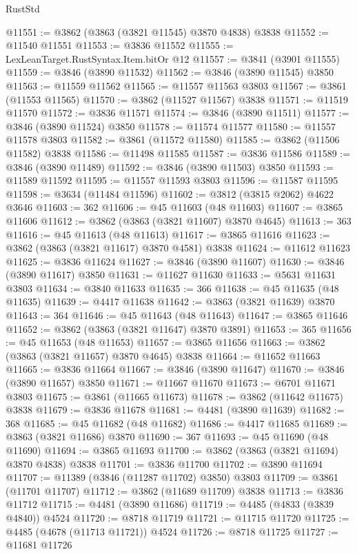 \begin{lexlean}{RustStd}
\begin{coremodule}
@11551 := @3862 (@3863 (@3821 @11545) @3870 @4838) @3838
@11552 := @11540 @11551
@11553 := @3836 @11552
@11555 := LexLeanTarget.RustSyntax.Item.bitOr @12
@11557 := @3841 (@3901 @11555)
@11559 := @3846 (@3890 @11532)
@11562 := @3846 (@3890 @11545) @3850
@11563 := @11559 @11562
@11565 := @11557 @11563 @3803
@11567 := @3861 (@11553 @11565)
@11570 := @3862 (@11527 @11567) @3838
@11571 := @11519 @11570
@11572 := @3836 @11571
@11574 := @3846 (@3890 @11511)
@11577 := @3846 (@3890 @11524) @3850
@11578 := @11574 @11577
@11580 := @11557 @11578 @3803
@11582 := @3861 (@11572 @11580)
@11585 := @3862 (@11506 @11582) @3838
@11586 := @11498 @11585
@11587 := @3836 @11586
@11589 := @3846 (@3890 @11489)
@11592 := @3846 (@3890 @11503) @3850
@11593 := @11589 @11592
@11595 := @11557 @11593 @3803
@11596 := @11587 @11595
@11598 := @3634 (@11484 @11596)
@11602 := @3812 (@3815 @2062) @4622 @3646
@11603 := 362
@11606 := @45 @11603 (@48 @11603)
@11607 := @3865 @11606
@11612 := @3862 (@3863 (@3821 @11607) @3870 @4645)
@11613 := 363
@11616 := @45 @11613 (@48 @11613)
@11617 := @3865 @11616
@11623 := @3862 (@3863 (@3821 @11617) @3870 @4581) @3838
@11624 := @11612 @11623
@11625 := @3836 @11624
@11627 := @3846 (@3890 @11607)
@11630 := @3846 (@3890 @11617) @3850
@11631 := @11627 @11630
@11633 := @5631 @11631 @3803
@11634 := @3840 @11633
@11635 := 366
@11638 := @45 @11635 (@48 @11635)
@11639 := @4417 @11638
@11642 := @3863 (@3821 @11639) @3870
@11643 := 364
@11646 := @45 @11643 (@48 @11643)
@11647 := @3865 @11646
@11652 := @3862 (@3863 (@3821 @11647) @3870 @3891)
@11653 := 365
@11656 := @45 @11653 (@48 @11653)
@11657 := @3865 @11656
@11663 := @3862 (@3863 (@3821 @11657) @3870 @4645) @3838
@11664 := @11652 @11663
@11665 := @3836 @11664
@11667 := @3846 (@3890 @11647)
@11670 := @3846 (@3890 @11657) @3850
@11671 := @11667 @11670
@11673 := @6701 @11671 @3803
@11675 := @3861 (@11665 @11673)
@11678 := @3862 (@11642 @11675) @3838
@11679 := @3836 @11678
@11681 := @4481 (@3890 @11639)
@11682 := 368
@11685 := @45 @11682 (@48 @11682)
@11686 := @4417 @11685
@11689 := @3863 (@3821 @11686) @3870
@11690 := 367
@11693 := @45 @11690 (@48 @11690)
@11694 := @3865 @11693
@11700 := @3862 (@3863 (@3821 @11694) @3870 @4838) @3838
@11701 := @3836 @11700
@11702 := @3890 @11694
@11707 := @11389 (@3846 (@11287 @11702) @3850) @3803
@11709 := @3861 (@11701 @11707)
@11712 := @3862 (@11689 @11709) @3838
@11713 := @3836 @11712
@11715 := @4481 (@3890 @11686)
@11719 := @4485 (@4833 (@3839 @4840)) @4524
@11720 := @8718 @11719
@11721 := @11715 @11720
@11725 := @4485 (@4678 (@11713 @11721)) @4524
@11726 := @8718 @11725
@11727 := @11681 @11726

\end{coremodule}
\end{lexlean}
